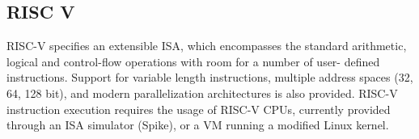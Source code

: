 \subsection{RISC V}
RISC-V \cite{riscv} specifies an extensible ISA, which encompasses the standard
arithmetic, logical and control-flow operations with room for a number of user-
defined instructions. Support for variable length instructions, multiple 
address spaces (32, 64, 128 bit), and modern parallelization architectures is
also provided. RISC-V instruction execution requires the usage of RISC-V CPUs,
currently provided through an ISA simulator (Spike), or a VM running a modified
Linux kernel.
